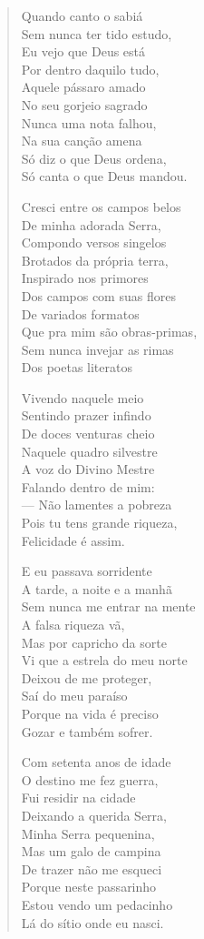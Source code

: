 \begin{verse}
Quando canto o sabiá\\
Sem nunca ter tido estudo,\\
Eu vejo que Deus está\\
Por dentro daquilo tudo,\\
Aquele pássaro amado\\
No seu gorjeio sagrado\\
Nunca uma nota falhou,\\
Na sua canção amena\\
Só diz o que Deus ordena,\\
Só canta o que Deus mandou.

Cresci entre os campos belos\\
De minha adorada Serra,\\
Compondo versos singelos\\
Brotados da própria terra,\\
Inspirado nos primores\\
Dos campos com suas flores\\
De variados formatos\\
Que pra mim são obras-primas,\\
Sem nunca invejar as rimas\\
Dos poetas literatos

Vivendo naquele meio\\
Sentindo prazer infindo\\
De doces venturas cheio\\
Naquele quadro silvestre\\
A voz do Divino Mestre\\
Falando dentro de mim:\\
--- Não lamentes a pobreza\\
Pois tu tens grande riqueza,\\
Felicidade é assim.

E eu passava sorridente\\
A tarde, a noite e a manhã\\
Sem nunca me entrar na mente\\
A falsa riqueza vã,\\
Mas por capricho da sorte\\
Vi que a estrela do meu norte\\
Deixou de me proteger,\\
Saí do meu paraíso\\
Porque na vida é preciso\\
Gozar e também sofrer.

Com setenta anos de idade\\
O destino me fez guerra,\\
Fui residir na cidade\\
Deixando a querida Serra,\\
Minha Serra pequenina,\\
Mas um galo de campina\\
De trazer não me esqueci\\
Porque neste passarinho\\
Estou vendo um pedacinho\\
Lá do sítio onde eu nasci.


\end{verse}
